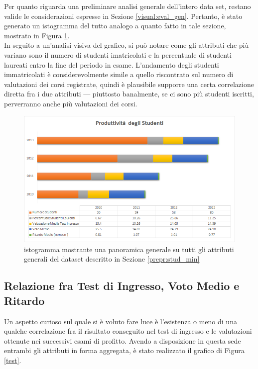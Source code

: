    Per quanto riguarda una preliminare analisi generale dell'intero data set, restano valide le considerazioni espresse in Sezione \ref{visual:eval_gen}. Pertanto, è stato generato un istogramma del tutto analogo a quanto fatto in tale sezione, mostrato in Figura \ref{stud_gen}. \\

    In seguito a un'analisi visiva del grafico, si può notare come gli attributi che più variano sono il numero di studenti imatricolati e la percentuale di studenti laureati entro la fine del periodo in esame. L'andamento degli studenti immatricolati è considerevolmente simile a quello riscontrato sul numero di valutazioni dei corsi registrate, quindi è plausibile supporre una certa correlazione diretta fra i due attributi --- piuttosto banalmente, se ci sono più studenti iscritti, perverranno anche più valutazioni dei corsi.

    \begin{figure}
        \centering
        \caption{istogramma mostrante una panoramica generale su tutti gli attributi generali del dataset descritto in Sezione \ref{prepr:stud_min}}
        \label{stud_gen}
        \includegraphics[scale=0.50]{../visual/stud_1.png}
    \end{figure}

    \subsection{Relazione fra Test di Ingresso, Voto Medio e Ritardo}

    Un aspetto curioso sul quale si è voluto fare luce è l'esistenza o meno di una qualche correlazione fra il risultato conseguito nel test di ingresso e le valutazioni ottenute nei successivi esami di profitto. Avendo a disposizione in questa sede entrambi gli attributi in forma aggregata, è stato realizzato il grafico di Figura \ref{test}. \\

